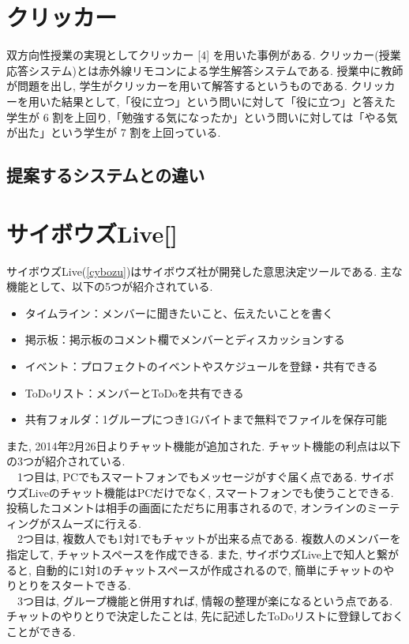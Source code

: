 \documentclass{funthesis}
\begin{document}
\section{クリッカー}
双方向性授業の実現としてクリッカー [4] を用いた事例がある. クリッカー(授業応答システム)とは赤外線リモコンによる学生解答システムである. 授業中に教師が問題を出し, 学生がクリッカーを用いて解答するというものである. クリッカーを用いた結果として,「役に立つ」という問いに対して「役に立つ」と答えた学生が 6 割を上回り,「勉強する気になったか」という問いに対しては「やる気が出た」という学生が 7 割を上回っている.
\subsection{提案するシステムとの違い}

\section{サイボウズLive[] }



サイボウズLive(\ref{cybozu})はサイボウズ社が開発した意思決定ツールである. 
主な機能として、以下の5つが紹介されている.
\begin{itemize}
 \item タイムライン：メンバーに聞きたいこと、伝えたいことを書く
 \item 掲示板：掲示板のコメント欄でメンバーとディスカッションする
 \item イベント：プロフェクトのイベントやスケジュールを登録・共有できる
 \item ToDoリスト：メンバーとToDoを共有できる
 \item 共有フォルダ：1グループにつき1Gバイトまで無料でファイルを保存可能
\end{itemize}
また, 2014年2月26日よりチャット機能が追加された. チャット機能の利点は以下の3つが紹介されている.\\
　1つ目は, PCでもスマートフォンでもメッセージがすぐ届く点である. サイボウズLiveのチャット機能はPCだけでなく, スマートフォンでも使うことできる. 投稿したコメントは相手の画面にただちに用事されるので, オンラインのミーティングがスムーズに行える. \\
　2つ目は,  複数人でも1対1でもチャットが出来る点である. 複数人のメンバーを指定して, チャットスペースを作成できる. また, サイボウズLive上で知人と繋がると, 自動的に1対1のチャットスペースが作成されるので, 簡単にチャットのやりとりをスタートできる. \\
　3つ目は,  グループ機能と併用すれば, 情報の整理が楽になるという点である. チャットのやりとりで決定したことは, 先に記述したToDoリストに登録しておくことができる. \\
\end{document}
